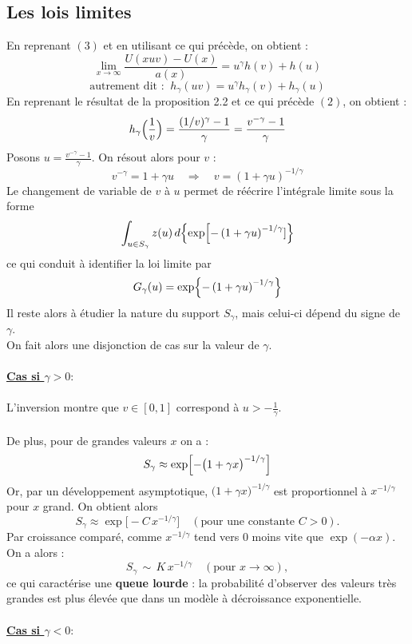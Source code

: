 \documentclass{article}
\theoremstyle{plain}
\theoremstyle{definition}
\theoremstyle{plain}
\begin{document}
\subsection{Les lois limites}
\noindent En reprenant $(3)$ et en utilisant ce qui précède, on obtient :
\[
\lim_{x\to \infty} \frac{U(xuv) - U(x)}{a(x)} = u^{\gamma} h(v) + h(u)
\]
\[
\text{autrement dit :} \; \; h_{\gamma}(uv)= u^{\gamma} h_{\gamma}(v) + h_{\gamma}(u)
\]
En reprenant le résultat de la proposition 2.2 et ce qui précède  $(2)$, on obtient :
\[
h_\gamma\Bigl(\frac{1}{v}\Bigr)=\frac{(1/v)^\gamma-1}{\gamma}=\frac{v^{-\gamma}-1}{\gamma}
\]
Posons \(u=\frac{v^{-\gamma}-1}{\gamma}\). On résout alors pour \(v\) :
\[
v^{-\gamma}=1+\gamma u\quad\Longrightarrow\quad v=(1+\gamma u)^{-1/\gamma}
\]
Le changement de variable de \(v\) à \(u\) permet de réécrire l'intégrale limite sous la forme
\[
\int_{u\in S_\gamma} z(u)\,d\Bigl\{\exp\Bigl[-\left(1+\gamma u\right)^{-1/\gamma}]\Bigr\}
\]
ce qui conduit à identifier la loi limite par
\[
G_\gamma(u)=\exp\Bigl\{-\left(1+\gamma u\right)^{-1/\gamma}\Bigr\}
\]
Il reste alors à étudier la nature du support \(S_\gamma\), mais celui-ci dépend du signe de \(\gamma\).
\\
On fait alors une disjonction de cas sur la valeur de $\gamma$.
\\
\\
\textbf{\underline{Cas si \(\gamma>0 : \)}}
\\
\\
L'inversion montre que \(v\in [0,1]\) correspond à \(u>-\frac{1}{\gamma}\).
\\
\\
De plus, pour de grandes valeurs \(x\) on a :
\[
S_{\gamma} \approx \exp\Bigl[-\bigl(1 + \gamma x\bigr)^{-1/\gamma}\Bigr]
\]
Or, par un développement asymptotique,  \(\bigl(1 + \gamma x\bigr)^{-1/\gamma}\) est proportionnel à \(x^{-1/\gamma}\) pour \(x\) grand. On obtient alors
\[
S_{\gamma} \approx \exp\bigl[-C\,x^{-1/\gamma}\bigr] 
\quad (\text{pour une constante } C>0).
\]
Par croissance comparé, comme \(x^{-1/\gamma}\) tend vers 0 moins vite que \(\exp(-\alpha x)\). On a alors : 
\[
S_{\gamma}\,\sim\, K\,x^{-1/\gamma} 
\quad (\text{pour } x\to\infty),
\]
ce qui caractérise une \textbf{queue lourde} : la probabilité d'observer des valeurs très grandes est plus élevée que dans un modèle à décroissance exponentielle.
\\
\\
\textbf{\underline{Cas si \(\gamma<0 : \)}}
\\
\\
\end{document}
